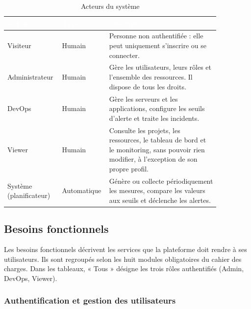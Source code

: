 \documentclass[11pt,a4paper]{article}
\begin{document}
\begin{table}[h]
\centering
\renewcommand{\arraystretch}{1.3}
\begin{tabular}{|L{0.22\linewidth}|L{0.14\linewidth}|L{0.50\linewidth}|}
\hline
{}
\textcolor{white}{\textbf{Acteur}} & \textcolor{white}{\textbf{Type}} & \textcolor{white}{\textbf{Description}} \\
\hline
Visiteur & Humain & Personne non authentifiée : elle peut uniquement s'inscrire
ou se connecter. \\ \hline
Administrateur & Humain & Gère les utilisateurs, leurs rôles et l'ensemble des
ressources. Il dispose de tous les droits. \\ \hline
DevOps & Humain & Gère les serveurs et les applications, configure les seuils
d'alerte et traite les incidents. \\ \hline
Viewer & Humain & Consulte les projets, les ressources, le tableau de bord et le
monitoring, sans pouvoir rien modifier, à l'exception de son propre profil. \\ \hline
Système (planificateur) & Automatique & Génère ou collecte périodiquement les
mesures, compare les valeurs aux seuils et déclenche les alertes. \\
\hline
\end{tabular}
\caption{Acteurs du système}
\label{tab:acteurs}
\end{table}

\subsection{Besoins fonctionnels}

Les besoins fonctionnels décrivent les services que la plateforme doit rendre à ses
utilisateurs. Ils sont regroupés selon les huit modules obligatoires du cahier des
charges. Dans les tableaux, « Tous » désigne les trois rôles authentifiés
(Admin, DevOps, Viewer).

\subsubsection{Authentification et gestion des utilisateurs}
\end{document}
